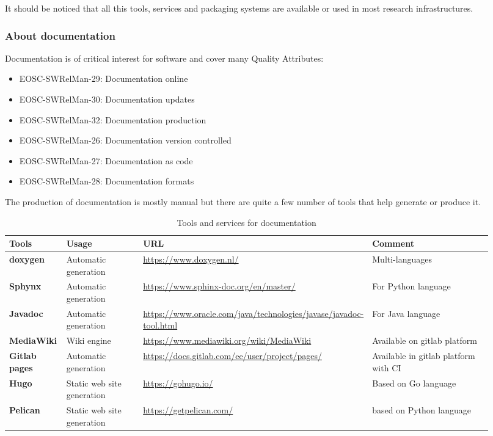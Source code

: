 It should be noticed that all this tools, services and packaging systems are available or used in most research infrastructures.

\subsubsection{About documentation}

Documentation is of critical interest for software and cover many Quality Attributes: 

\begin{itemize}
  \item EOSC-SWRelMan-29: Documentation online
  \item EOSC-SWRelMan-30: Documentation updates
  \item EOSC-SWRelMan-32: Documentation production
  \item EOSC-SWRelMan-26: Documentation version controlled
  \item EOSC-SWRelMan-27: Documentation as code
  \item EOSC-SWRelMan-28: Documentation formats
\end{itemize}

The production of documentation is mostly manual but there are quite a few number of tools that help generate or produce it.

\begin{center}
\begin{table}[h]

  \small
  \begin{tabular}{|p{0.12\linewidth}|p{0.2\linewidth}|p{0.25\linewidth}|p{0.35\linewidth}|} \hline

    \textbf{Tools} & \textbf{Usage} & \textbf{URL} & \textbf{Comment} \\ \hline \hline
    \textbf{doxygen} & Automatic generation & \url{https://www.doxygen.nl/} & Multi-languages \\ \hline
    \textbf{Sphynx} & Automatic generation & \url{https://www.sphinx-doc.org/en/master/} & For Python language \\ \hline
    \textbf{Javadoc} & Automatic generation & \url{https://www.oracle.com/java/technologies/javase/javadoc-tool.html} & For Java language  \\ \hline
    \textbf{MediaWiki} & Wiki engine & \url{https://www.mediawiki.org/wiki/MediaWiki} &  Available on gitlab platform \\ \hline
    \textbf{Gitlab pages} & Automatic generation & \url{https://docs.gitlab.com/ee/user/project/pages/} & Available in gitlab platform with CI  \\ \hline
    \textbf{Hugo} & Static web site generation & \url{https://gohugo.io/} & Based on Go language \\ \hline
    \textbf{Pelican} & Static web site generation & \url{https://getpelican.com/} & based on Python language \\ \hline

  \end{tabular}
  \caption{Tools and services for documentation}
  \label{tab:tools_pack02}
\end{table}
\end{center}

